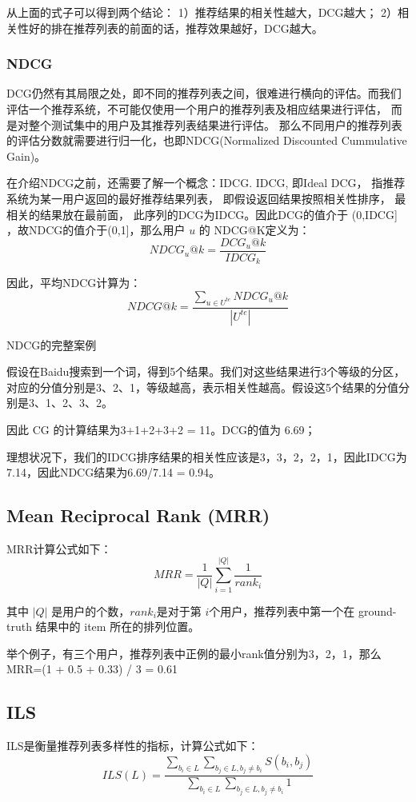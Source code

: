\documentclass[12pt]{article}
\begin{document}
从上面的式子可以得到两个结论：
1）推荐结果的相关性越大，DCG越大；
2）相关性好的排在推荐列表的前面的话，推荐效果越好，DCG越大。

\subsubsection{NDCG}
DCG仍然有其局限之处，即不同的推荐列表之间，很难进行横向的评估。而我们评估一个推荐系统，不可能仅使用一个用户的推荐列表及相应结果进行评估， 而是对整个测试集中的用户及其推荐列表结果进行评估。 那么不同用户的推荐列表的评估分数就需要进行归一化，也即NDCG(Normalized Discounted Cummulative Gain)。

在介绍NDCG之前，还需要了解一个概念：IDCG. IDCG, 即Ideal DCG， 指推荐系统为某一用户返回的最好推荐结果列表， 即假设返回结果按照相关性排序， 最相关的结果放在最前面， 此序列的DCG为IDCG。因此DCG的值介于 (0,IDCG] ，故NDCG的值介于(0,1]，那么用户 $u$ 的 NDCG@K定义为：
$$
NDCG_u@k = \frac{DCG_u@k}{IDCG_k}
$$

因此，平均NDCG计算为：
$$
NDCG@k = \frac{\sum_{u \in U^{te}}NDCG_u@k}{|U^{te}|}
$$

\begin{framed}
NDCG的完整案例

假设在Baidu搜索到一个词，得到5个结果。我们对这些结果进行3个等级的分区，对应的分值分别是3、2、1，等级越高，表示相关性越高。假设这5个结果的分值分别是3、1、2、3、2。

因此 CG 的计算结果为3+1+2+3+2 = 11。DCG的值为 6.69；

理想状况下，我们的IDCG排序结果的相关性应该是3，3，2，2，1，因此IDCG为7.14，因此NDCG结果为6.69/7.14 = 0.94。
\end{framed}

\subsection{Mean Reciprocal Rank (MRR)\cite{Common_Evaluation_Index_In_Recommender_System}}
MRR计算公式如下：
$$
MRR = \frac{1}{|Q|}\sum_{i=1}^{|Q|}\frac{1}{rank_i}
$$

其中 $|Q|$ 是用户的个数，$rank_i$是对于第 $i$个用户，推荐列表中第一个在 ground-truth 结果中的 item 所在的排列位置。

举个例子，有三个用户，推荐列表中正例的最小rank值分别为3，2，1，那么MRR=(1 + 0.5 + 0.33) / 3 = 0.61

\subsection{ILS\cite{Common_Evaluation_Index_In_Recommender_System}}
ILS是衡量推荐列表多样性的指标，计算公式如下：
$$
ILS(L) = \frac{\sum_{b_i \in L}\sum_{b_j \in L, b_j \neq b_i} S(b_i, b_j)}{\sum_{b_i \in L}\sum_{b_j \in L, b_j \neq b_i} 1}
$$
\end{document}
